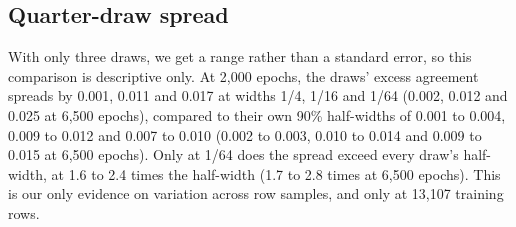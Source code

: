 \subsection{Quarter-draw spread}
With only three draws, we get a range rather than a standard error, so this comparison is descriptive only.
At 2,000 epochs, the draws' excess agreement spreads by 0.001, 0.011 and 0.017 at widths 1/4, 1/16 and 1/64 (0.002, 0.012 and 0.025 at 6,500 epochs), compared to their own 90\% half-widths of 0.001 to 0.004, 0.009 to 0.012 and 0.007 to 0.010 (0.002 to 0.003, 0.010 to 0.014 and 0.009 to 0.015 at 6,500 epochs).
Only at 1/64 does the spread exceed every draw's half-width, at 1.6 to 2.4 times the half-width (1.7 to 2.8 times at 6,500 epochs).
This is our only evidence on variation across row samples, and only at 13,107 training rows.
